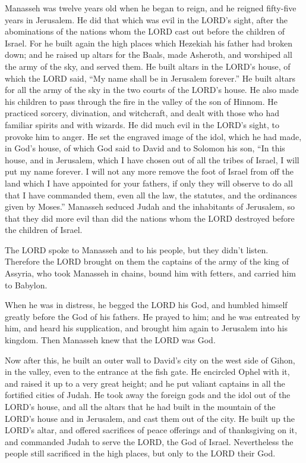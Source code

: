 \mychapter{} \myverse*{}Manasseh was twelve years old when he began to reign, and he reigned
fifty-five years in Jerusalem.
\myverse{}He did that which was evil in the LORD’s sight, after the abominations of the
nations whom the LORD cast out before the children of Israel.
\myverse{}For he built again the high places which Hezekiah his father had broken down;
and he raised up altars for the Baals, made Asheroth, and worshiped all the army of the sky, and served
them.
\myverse{}He built altars in the LORD’s house, of which the LORD said, “My name shall
be in Jerusalem forever.”
\myverse{}He built altars for all the army of the sky in the two courts of the LORD’s
house.
\myverse{}He also made his children to pass through the fire in the valley of the son
of Hinnom. He practiced sorcery, divination, and witchcraft, and dealt with those who had familiar spirits
and with wizards. He did much evil in the LORD’s sight, to provoke him to anger.
\myverse{}He set the engraved image of the idol, which he had made, in God’s house, of
which God said to David and to Solomon his son, “In this house, and in Jerusalem, which I have chosen
out of all the tribes of Israel, I will put my name forever.
\myverse{}I will not any more remove the foot of Israel from off the land which I have
appointed for your fathers, if only they will observe to do all that I have commanded them, even all the
law, the statutes, and the ordinances given by Moses.”
\myverse{}Manasseh seduced Judah and the inhabitants of Jerusalem, so that they did more
evil than did the nations whom the LORD destroyed before the children of Israel.

\myverse{}The LORD spoke to Manasseh and to his people, but they didn’t
listen.
\myverse{}Therefore the LORD brought on them the captains of the army of the king of
Assyria, who took Manasseh in chains, bound him with fetters, and carried him to Babylon.

\myverse{}When he was in distress, he begged the LORD his God, and humbled
himself greatly before the God of his fathers.
\myverse{}He prayed to him; and he was entreated by him, and heard his supplication,
and brought him again to Jerusalem into his kingdom. Then Manasseh knew that the LORD was God.

\myverse{}Now after this, he built an outer wall to David’s city on the
west side of Gihon, in the valley, even to the entrance at the fish gate. He encircled Ophel with it,
and raised it up to a very great height; and he put valiant captains in all the fortified cities of Judah.
\myverse{}He took away the foreign gods and the idol out of the LORD’s house, and all
the altars that he had built in the mountain of the LORD’s house and in Jerusalem, and cast them out of
the city.
\myverse{}He built up the LORD’s altar, and offered sacrifices of peace offerings and
of thanksgiving on it, and commanded Judah to serve the LORD, the God of Israel.
\myverse{}Nevertheless the people still sacrificed in the high places, but only to
the LORD their God.

